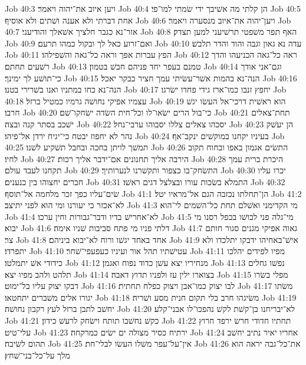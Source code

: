 Job 40:3  ויען איוב את־יהוה ויאמר׃
Job 40:4  הן קלתי מה אשׁיבך ידי שׂמתי למו־פי׃
Job 40:5  אחת דברתי ולא אענה ושׁתים ולא אוסיף׃
Job 40:6  ויען־יהוה את־איוב מנסערה ויאמר׃
Job 40:7  אזר־נא כגבר חלציך אשׁאלך והודיעני׃
Job 40:8  האף תפר משׁפטי תרשׁיעני למען תצדק׃
Job 40:9  ואם־זרוע כאל לך ובקול כמהו תרעם׃
Job 40:10  עדה נא גאון וגבה והוד והדר תלבשׁ׃
Job 40:11  הפץ עברות אפך וראה כל־גאה והשׁפילהו׃
Job 40:12  ראה כל־גאה הכניעהו והדך רשׁעים תחתם׃
Job 40:13  טמנם בעפר יחד פניהם חבשׁ בטמון׃
Job 40:14  וגם־אני אודך כי־תושׁע לך ימינך׃
Job 40:15  הנה־נא בהמות אשׁר־עשׂיתי עמך חציר כבקר יאכל׃
Job 40:16  הנה־נא כחו במתניו ואנו בשׁרירי בטנו׃
Job 40:17  יחפץ זנבו כמו־ארז גידי פחדו ישׂרגו׃
Job 40:18  עצמיו אפיקי נחושׁה גרמיו כמטיל ברזל׃
Job 40:19  הוא ראשׁית דרכי־אל העשׂו יגשׁ חרבו׃
Job 40:20  כי־בול הרים ישׂאו־לו וכל־חית השׂדה ישׂחקו־שׁם׃
Job 40:21  תחת־צאלים ישׁכב בסתר קנה ובצה׃
Job 40:22  יסכהו צאלים צללו יסבוהו ערבי־נחל׃
Job 40:23  הן יעשׁק נהר לא יחפוז יבטח כי־יגיח ירדן אל־פיהו׃
Job 40:24  בעיניו יקחנו במוקשׁים ינקב־אף׃
Job 40:25  תמשׁך לויתן בחכה ובחבל תשׁקיע לשׁנו׃
Job 40:26  התשׂים אגמון באפו ובחוח תקוב לחיו׃
Job 40:27  הירבה אליך תחנונים אם־ידבר אליך רכות׃
Job 40:28  היכרת ברית עמך תקחנו לעבד עולם׃
Job 40:29  התשׂחק־בו כצפור ותקשׁרנו לנערותיך׃
Job 40:30  יכרו עליו חברים יחצוהו בין כנענים׃
Job 40:31  התמלא בשׂכות עורו ובצלצל דגים ראשׁו׃
Job 40:32  שׂים־עליו כפך זכר מלחמה אל־תוסף׃
Job 41:1  הן־תחלתו נכזבה הגם אל־מראיו יטל׃
Job 41:2  לא־אכזר כי יעורנו ומי הוא לפני יתיצב׃
Job 41:3  מי הקדימני ואשׁלם תחת כל־השׁמים לי־הוא׃
Job 41:4  לא־אחרישׁ בדיו ודבר־גבורות וחין ערכו׃
Job 41:5  מי־גלה פני לבושׁו בכפל רסנו מי יבוא׃
Job 41:6  דלתי פניו מי פתח סביבות שׁניו אימה׃
Job 41:7  גאוה אפיקי מגנים סגור חותם צר׃
Job 41:8  אחד באחד יגשׁו ורוח לא־יבוא ביניהם׃
Job 41:9  אישׁ־באחיהו ידבקו יתלכדו ולא יתפרדו׃
Job 41:10  עטישׁתיו תהל אור ועיניו כעפעפי־שׁחר׃
Job 41:11  מפיו לפידים יהלכו כידודי אשׁ יתמלטו׃
Job 41:12  מנחיריו יצא עשׁן כדוד נפוח ואגמן׃
Job 41:13  נפשׁו גחלים תלהט ולהב מפיו יצא׃
Job 41:14  בצוארו ילין עז ולפניו תדוץ דאבה׃
Job 41:15  מפלי בשׂרו דבקו יצוק עליו בל־ימוט׃
Job 41:16  לבו יצוק כמו־אבן ויצוק כפלח תחתית׃
Job 41:17  משׂתו יגורו אלים משׁברים יתחטאו׃
Job 41:18  משׂיגהו חרב בלי תקום חנית מסע ושׁריה׃
Job 41:19  יחשׁב לתבן ברזל לעץ רקבון נחושׁה׃
Job 41:20  לא־יבריחנו בן־קשׁת לקשׁ נהפכו־לו אבני־קלע׃
Job 41:21  כקשׁ נחשׁבו תותח וישׂחק לרעשׁ כידון׃
Job 41:22  תחתיו חדודי חרשׂ ירפד חרוץ עלי־טיט׃
Job 41:23  ירתיח כסיר מצולה ים ישׂים כמרקחה׃
Job 41:24  אחריו יאיר נתיב יחשׁב תהום לשׂיבה׃
Job 41:25  אין־על־עפר משׁלו העשׂו לבלי־חת׃
Job 41:26  את־כל־גבה יראה הוא מלך על־כל־בני־שׁחץ׃
